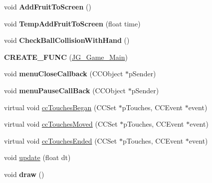 \begin{DoxyCompactItemize}
\item 
\hypertarget{class_j_g___game___main_ae3958d0acca40af88f7dbd5b3ace721b}{void {\bfseries Add\-Fruit\-To\-Screen} ()}\label{class_j_g___game___main_ae3958d0acca40af88f7dbd5b3ace721b}

\item 
\hypertarget{class_j_g___game___main_aaa275770c267d1d447afde3c0d015595}{void {\bfseries Temp\-Add\-Fruit\-To\-Screen} (float time)}\label{class_j_g___game___main_aaa275770c267d1d447afde3c0d015595}

\item 
\hypertarget{class_j_g___game___main_a7ced3e6ecebc1c0b6f14fc8f79c7f0b4}{void {\bfseries Check\-Ball\-Collision\-With\-Hand} ()}\label{class_j_g___game___main_a7ced3e6ecebc1c0b6f14fc8f79c7f0b4}

\item 
\hypertarget{class_j_g___game___main_ad94a26b81515a717556314a3a8c65b31}{{\bfseries C\-R\-E\-A\-T\-E\-\_\-\-F\-U\-N\-C} (\hyperlink{class_j_g___game___main}{J\-G\-\_\-\-Game\-\_\-\-Main})}\label{class_j_g___game___main_ad94a26b81515a717556314a3a8c65b31}

\item 
\hypertarget{class_j_g___game___main_a42558255c3477748cfadf9d501a02b56}{void {\bfseries menu\-Close\-Callback} (C\-C\-Object $\ast$p\-Sender)}\label{class_j_g___game___main_a42558255c3477748cfadf9d501a02b56}

\item 
\hypertarget{class_j_g___game___main_a2e2740b51a8e5ac7b981078dbd7bbd70}{void {\bfseries menu\-Pause\-Call\-Back} (C\-C\-Object $\ast$p\-Sender)}\label{class_j_g___game___main_a2e2740b51a8e5ac7b981078dbd7bbd70}

\item 
virtual void \hyperlink{class_j_g___game___main_a9c8aac91fd97b7a88da7819b8ead4206}{cc\-Touches\-Began} (C\-C\-Set $\ast$p\-Touches, C\-C\-Event $\ast$event)
\item 
virtual void \hyperlink{class_j_g___game___main_ad3ecad4bd190ff37f5b6ba1da9fbe16c}{cc\-Touches\-Moved} (C\-C\-Set $\ast$p\-Touches, C\-C\-Event $\ast$event)
\item 
virtual void \hyperlink{class_j_g___game___main_a0bc1f108b8a56226cfe84ce9d28d56b4}{cc\-Touches\-Ended} (C\-C\-Set $\ast$p\-Touches, C\-C\-Event $\ast$event)
\item 
void \hyperlink{class_j_g___game___main_aea78b9aef2cf228b6945fa88bf741c3a}{update} (float dt)
\item 
\hypertarget{class_j_g___game___main_a73e825c414b65020ebd84ddaebcaef80}{void {\bfseries draw} ()}\label{class_j_g___game___main_a73e825c414b65020ebd84ddaebcaef80}


\end{DoxyCompactItemize}
